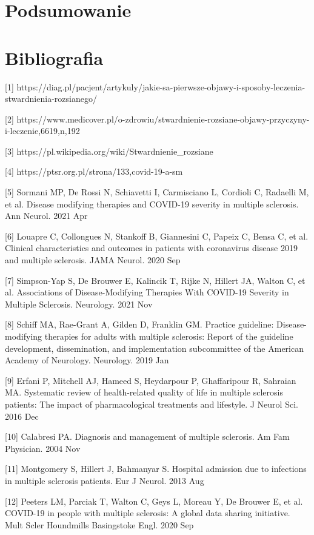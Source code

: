 \documentclass[a4paper,fleqn]{cas-dc}
\begin{document}
\section{Podsumowanie}


\section{Bibliografia}

[1] https://diag.pl/pacjent/artykuly/jakie-sa-pierwsze-objawy-i-sposoby-leczenia-stwardnienia-rozsianego/

[2] https://www.medicover.pl/o-zdrowiu/stwardnienie-rozsiane-objawy-przyczyny-i-leczenie,6619,n,192

[3] https://pl.wikipedia.org/wiki/Stwardnienie\_rozsiane

[4] https://ptsr.org.pl/strona/133,covid-19-a-sm

[5] Sormani MP, De Rossi N, Schiavetti I, Carmisciano L, Cordioli C, Radaelli M, et al. Disease modifying therapies and COVID-19 severity in multiple sclerosis. Ann Neurol. 2021 Apr

[6] Louapre C, Collongues N, Stankoff B, Giannesini C, Papeix C, Bensa C, et al. Clinical characteristics and outcomes in patients with coronavirus disease 2019 and multiple sclerosis. JAMA Neurol. 2020 Sep

[7] Simpson-Yap S, De Brouwer E, Kalincik T, Rijke N, Hillert JA, Walton C, et al. Associations of Disease-Modifying Therapies With COVID-19 Severity in Multiple Sclerosis. Neurology. 2021 Nov

[8] Schiff MA, Rae-Grant A, Gilden D, Franklin GM. Practice guideline: Disease-modifying therapies for adults with multiple sclerosis: Report of the guideline development, dissemination, and implementation subcommittee of the American Academy of Neurology. Neurology. 2019 Jan

[9] Erfani P, Mitchell AJ, Hameed S, Heydarpour P, Ghaffaripour R, Sahraian MA. Systematic review of health-related quality of life in multiple sclerosis patients: The impact of pharmacological treatments and lifestyle. J Neurol Sci. 2016 Dec

[10] Calabresi PA. Diagnosis and management of multiple sclerosis. Am Fam Physician. 2004 Nov

[11] Montgomery S, Hillert J, Bahmanyar S. Hospital admission due to infections in multiple sclerosis patients. Eur J Neurol. 2013 Aug

[12] Peeters LM, Parciak T, Walton C, Geys L, Moreau Y, De Brouwer E, et al. COVID-19 in people with multiple sclerosis: A global data sharing initiative. Mult Scler Houndmills Basingstoke Engl. 2020 Sep
\end{document}
